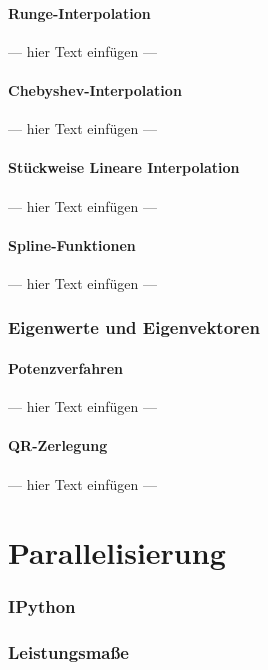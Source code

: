 \documentclass[a4paper, 12pt]{article}
\begin{document}
\subsection{Runge-Interpolation}
--- hier Text einfügen ---


\subsection{Chebyshev-Interpolation}
--- hier Text einfügen ---


\subsection{Stückweise Lineare Interpolation}
--- hier Text einfügen ---


\subsection{Spline-Funktionen}
--- hier Text einfügen ---



\section{Eigenwerte und Eigenvektoren}


\subsection{Potenzverfahren}
--- hier Text einfügen ---


\subsection{QR-Zerlegung}
--- hier Text einfügen ---




\part{Parallelisierung}



\section{IPython}



\section{Leistungsmaße}
\end{document}
